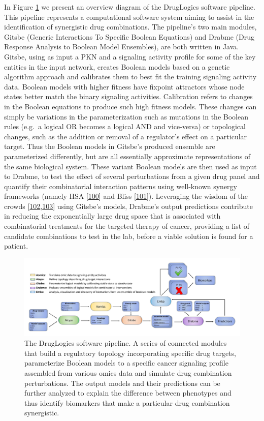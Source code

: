 \documentclass[
  12pt,
]{book}
\begin{document}
In Figure \ref{fig:fig5} we present an overview diagram of the DrugLogics software pipeline.
This pipeline represents a computational software system aiming to assist in the identification of synergistic drug combinations.
The pipeline's two main modules, Gitsbe (Generic Interactions To Specific Boolean Equations) and Drabme (Drug Response Analysis to Boolean Model Ensembles), are both written in Java.
Gitsbe, using as input a PKN and a signaling activity profile for some of the key entities in the input network, creates Boolean models based on a genetic algorithm approach and calibrates them to best fit the training signaling activity data.
Boolean models with higher fitness have fixpoint attractors whose node states better match the binary signaling activities.
Calibration refers to changes in the Boolean equations to produce such high fitness models.
These changes can simply be variations in the parameterization such as mutations in the Boolean rules (e.g.~a logical OR becomes a logical AND and vice-versa) or topological changes, such as the addition or removal of a regulator's effect on a particular target.
Thus the Boolean models in Gitsbe's produced ensemble are parameterized differently, but are all essentially approximate representations of the same biological system.
These variant Boolean models are then used as input to Drabme, to test the effect of several perturbations from a given drug panel and quantify their combinatorial interaction patterns using well-known synergy frameworks (namely HSA {[}\protect\hyperlink{ref-gaddum1940pharmacology}{100}{]} and Bliss {[}\protect\hyperlink{ref-Bliss1939}{101}{]}).
Leveraging the wisdom of the crowds {[}\protect\hyperlink{ref-Galton1907}{102},\protect\hyperlink{ref-Marbach2012}{103}{]} using Gitsbe's models, Drabme's output predictions contribute in reducing the exponentially large drug space that is associated with combinatorial treatments for the targeted therapy of cancer, providing a list of candidate combinations to test in the lab, before a viable solution is found for a patient.



\begin{figure}
\includegraphics[width=1\linewidth]{img/pipeline} \caption{The DrugLogics software pipeline. A series of connected modules that build a regulatory topology incorporating specific drug targets, parameterize Boolean models to a specific cancer signaling profile assembled from various omics data and simulate drug combination perturbations. The output models and their predictions can be further analyzed to explain the difference between phenotypes and thus identify biomarkers that make a particular drug combination synergistic.}\label{fig:fig5}
\end{figure}
\end{document}
